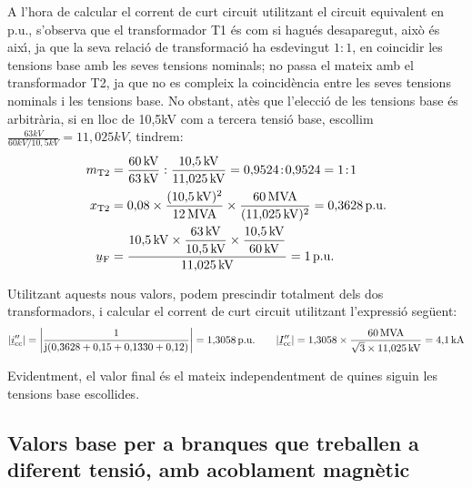 \begin{exemple}
 A l'hora de calcular el corrent de curt circuit utilitzant el circuit equivalent en p.u.,
 s'observa que el transformador T1 \'{e}s com si hagu\'{e}s desaparegut,
 aix\`{o} \'{e}s aix\'{\i}, ja que la seva relaci\'{o} de transformaci\'{o} ha esdevingut
 $1\!:\!1$, en coincidir les tensions base amb les seves tensions nominals;
 no passa el mateix amb el transformador T2, ja que no es compleix
 la coincid\`{e}ncia entre les seves tensions nominals i les tensions
 base. No obstant, at\`{e}s que l'elecci\'{o} de les tensions base \'{e}s
 arbitr\`{a}ria, si en lloc de 10,5\unit{kV} com a tercera tensi\'{o} base,
 escollim
 $\frac{63\unit{kV}}{60\unit{kV} / 10{,}5\unit{kV}}=11{,}025\unit{kV}$,
 tindrem:
\begin{align*}
   m\ped{T2} &= \frac{60\unit{kV}}{63\unit{kV}} : \frac{10{,}5\unit{kV}}{11{,}025\unit{kV}}
   = 0{,}9524\!:\!0{,}9524 = 1\!:\!1 \\
   x\ped{T2} &= 0{,}08 \times \frac{(10{,}5\unit{kV})^2}{12\unit{MVA}} \times
   \frac{60\unit{MVA}}{(11{,}025\unit{kV})^2}  = 0{,}3628\unit{p.u.}\\
   \cmplx{u}\ped{F} &= \frac{10{,}5\unit{kV} \times \dfrac{63\unit{kV}}{10{,}5\unit{kV}} \times
   \dfrac{10{,}5\unit{kV}}{60\unit{kV}}}{11{,}025\unit{kV}} = 1\unit{p.u.}
\end{align*}

Utilitzant aquests nous valors, podem prescindir totalment dels dos
transformadors, i calcular el corrent de curt circuit utilitzant
l'expressi\'{o} seg\"{u}ent:
\[
|\cmplx{i}''\ped{cc}| = \left| \frac{1}{\ju ( 0{,}3628 + 0{,}15 +
0{,}1330 + 0{,}12 )} \right| = 1{,}3058\unit{p.u.} \qquad
|\cmplx{I}''\ped{cc}| =
1{,}3058\times\frac{60\unit{MVA}}{\sqrt{3}\times 11{,}025\unit{kV}} =
4{,}1\unit{kA}
\]

Evidentment, el valor final \'{e}s el mateix independentment de quines
siguin les tensions base escollides.
\end{exemple}

\subsection{Valors base per a branques que treballen a diferent tensi\'{o}, amb acoblament magn\`{e}tic}

